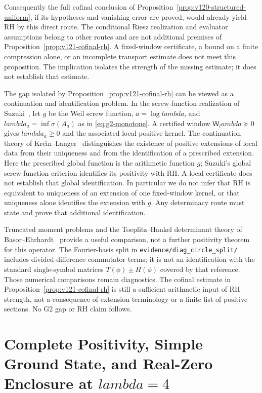 \documentclass[11pt]{article}
\def\lambda{lambda}%
\theoremstyle{remark}
\begin{document}
Consequently the full cofinal conclusion of
Proposition~\ref{prop:v120-structured-uniform}, if its hypotheses and
vanishing error are proved, would already yield RH by this direct route.
The conditional Riesz realization and evaluator assumptions belong to
other routes and are not additional premises of
Proposition~\ref{prop:v121-cofinal-rh}. A fixed-window certificate,
a bound on a finite compression alone, or an incomplete transport
estimate does not meet this proposition. The implication isolates the
strength of the missing estimate; it does not establish that estimate.

The gap isolated by Proposition~\ref{prop:v121-cofinal-rh} can be
viewed as a continuation and identification problem. In the screw-function
realization of Suzuki~\cite{Suzuki2026}, let $g$ be the Weil screw
function, $a=\log\lambda$, and $\lambda_a=\inf\sigma(A_a)$ as in
\eqref{eq:g2-monotone}. A certified window
$\mathsf W_\lambda\succeq0$ gives $\lambda_a\ge0$ and the associated
local positive kernel. The continuation theory of
Kre\u{\i}n--Langer~\cite{KreinLanger2014} distinguishes the existence of
positive extensions of local data from their uniqueness and from the
identification of a prescribed extension. Here the prescribed global
function is the arithmetic function $g$; Suzuki's global screw-function
criterion identifies its positivity with RH. A local certificate does
not establish that global identification. In particular we do not infer
that RH is equivalent to uniqueness of an extension of one fixed-window
kernel, or that uniqueness alone identifies the extension with $g$.
Any determinacy route must state and prove that additional identification.

Truncated moment problems and the Toeplitz--Hankel determinant theory
of Basor--Ehrhardt~\cite{BasorEhrhardt2002} provide a useful comparison,
not a further positivity theorem for this operator. The Fourier-basis
split in \texttt{evidence/diag\_circle\_split/} includes divided-difference
commutator terms; it is not an identification with the standard
single-symbol matrices $T(\phi)\pm H(\phi)$ covered by that reference.
Those numerical comparisons remain diagnostics. The cofinal estimate in
Proposition~\ref{prop:v121-cofinal-rh} is still a sufficient arithmetic
input of RH strength, not a consequence of extension terminology or a
finite list of positive sections. No G2 gap or RH claim follows.


\section{Complete Positivity, Simple Ground State, and Real-Zero Enclosure at \texorpdfstring{$\lambda=4$}{lambda=4}}\label{sec:pillar2}
\end{document}
